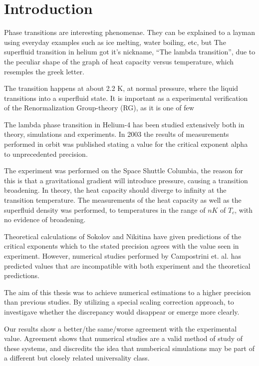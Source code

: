 %

\section{Introduction}
Phase transitions are interesting phenomenae. They can be explained to a layman using everyday examples such as ice melting, water boiling, etc, but 
The superfluid transition in helium got it's nickname, ``The lambda transition'', due to the peculiar shape of the graph of heat capacity versus temperature, which resemples the greek letter. 

The transition happens at about 2.2 K, at normal pressure, where the liquid transitions into a superfluid state. It is important as a experimental verification of the Renormalization Group-theory (RG), as it is one of few 

The lambda phase transition in Helium-4 has been studied extensively both in theory, simulations and experiments. In 2003 the results of measurements performed in orbit was published\cite{Lipa2003} stating a value for the critical exponent alpha to unprecedented precision.

The experiment was performed on the Space Shuttle Columbia, the reason for this is that a gravitational gradient will introduce pressure, causing a transition broadening. In theory, the heat capacity should diverge to infinity at the transition temperature.
The measurements of the heat capacity as well as the superfluid density was performed, to temperatures in the range of $nK$ of $T_c$, with no evidence of broadening.

Theoretical calculations of Sokolov and Nikitina \cite{Sokolov2016} have given predictions of the critical exponents which to the stated precision agrees with the value seen in experiment.
However, numerical studies performed by Campostrini et. al. \cite{Campostrini2006} has predicted values that are incompatible with both experiment and the theoretical predictions. 

The aim of this thesis was to achieve numerical estimations to a higher precision than previous studies. By utilizing a special scaling correction approach, to investigave whether the discrepancy would disappear or emerge more clearly. 

Our results show a better/the same/worse agreement with the experimental value. Agreement shows that numerical studies are a valid method of study of these systems, and discredits the idea that numberical simulations may be part of a different but closely related universality class.


